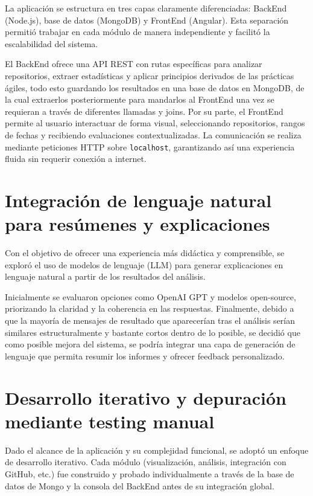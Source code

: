 La aplicación se estructura en tres capas claramente diferenciadas: BackEnd (Node.js), base de datos (MongoDB) y FrontEnd (Angular). Esta separación permitió trabajar en cada módulo de manera independiente y facilitó la escalabilidad del sistema.

El BackEnd ofrece una API REST con rutas específicas para analizar repositorios, extraer estadísticas y aplicar principios derivados de las prácticas ágiles, todo esto guardando los resultados en una base de datos en MongoDB, de la cual extraerlos posteriormente para mandarlos al FrontEnd una vez se requieran a través de diferentes llamadas y joins. Por su parte, el FrontEnd permite al usuario interactuar de forma visual, seleccionando repositorios, rangos de fechas y recibiendo evaluaciones contextualizadas. La comunicación se realiza mediante peticiones HTTP sobre \texttt{localhost}, garantizando así una experiencia fluida sin requerir conexión a internet.

\section{Integración de lenguaje natural para resúmenes y explicaciones}

Con el objetivo de ofrecer una experiencia más didáctica y comprensible, se exploró el uso de modelos de lenguaje (LLM) para generar explicaciones en lenguaje natural a partir de los resultados del análisis. 

Inicialmente se evaluaron opciones como OpenAI GPT y modelos open-source, priorizando la claridad y la coherencia en las respuestas. Finalmente, debido a que la mayoría de mensajes de resultado que aparecerían tras el análisis serían similares estructuralmente y bastante cortos dentro de lo posible, se decidió que como posible mejora del sistema, se podría integrar una capa de generación de lenguaje que permita resumir los informes y ofrecer feedback personalizado.

\section{Desarrollo iterativo y depuración mediante testing manual}

Dado el alcance de la aplicación y su complejidad funcional, se adoptó un enfoque de desarrollo iterativo. Cada módulo (visualización, análisis, integración con GitHub, etc.) fue construido y probado individualmente a través de la base de datos de Mongo y la consola del BackEnd antes de su integración global.

